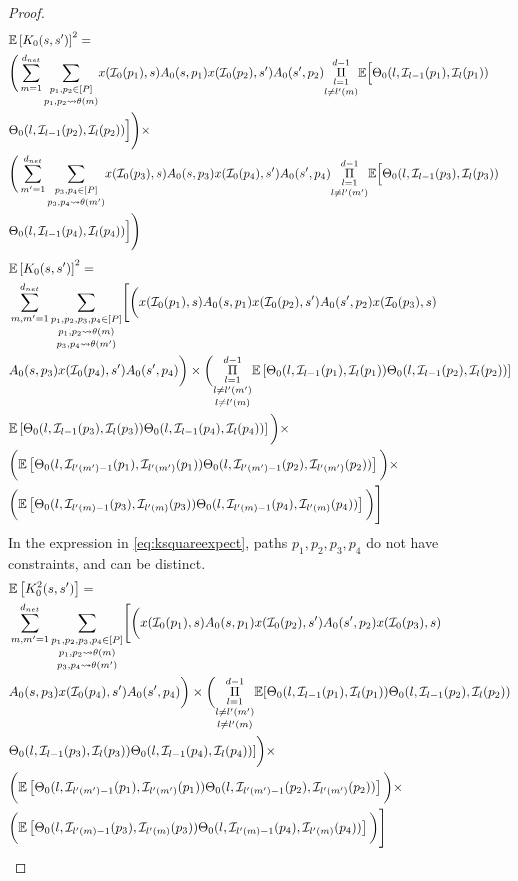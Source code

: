 \begin{appendix}
\begin{proof}
\begin{align*}
&\mathbb{E}\left[K_0(s,s')\right]^2=\\
&\Bigg(\sum_{m=1}^{d_{net}}\underset{p_1,p_2\rightsquigarrow\theta(m)}{\sum_{p_1,p_2\in[P]}}x(\mathcal{I}_0(p_1),s)A_0(s,p_1)x(\mathcal{I}_0(p_2),s')A_0(s',p_2) \underset{l\neq l'(m)}{\underset{l=1}{\overset{d-1}{\Pi}}} \mathbb{E}\Big[{\Theta}_0(l,\mathcal{I}_{l-1}(p_1),\mathcal{I}_{l}(p_1)) &\\ 
&{\Theta}_0(l,\mathcal{I}_{l-1}(p_2),\mathcal{I}_{l}(p_2))\Big]\Bigg)\times\\
&\Bigg(\sum_{m'=1}^{d_{net}}\underset{p_3,p_4\rightsquigarrow\theta(m')}{\sum_{p_3,p_4\in[P]}}x(\mathcal{I}_0(p_3),s)A_0(s,p_3)x(\mathcal{I}_0(p_4),s')A_0(s',p_4) \underset{l\neq l'(m')}{\underset{l=1}{\overset{d-1}{\Pi}}} \mathbb{E}\Big[{\Theta}_0(l,\mathcal{I}_{l-1}(p_3),\mathcal{I}_{l}(p_3)) &\\
&{\Theta}_0(l,\mathcal{I}_{l-1}(p_4),\mathcal{I}_{l}(p_4))\Big]\Bigg)\\
\end{align*}
\begin{align}\label{eq:kexpectsquare}
&\mathbb{E}\left[K_0(s,s')\right]^2=\nonumber\\
&\sum_{m,m'=1}^{d_{net}}\underset{p_3,p_4\rightsquigarrow\theta(m')}{\underset{p_1,p_2\rightsquigarrow\theta(m)}{\sum_{p_1,p_2,p_3,p_4\in[P]}}}\Bigg[\bigg(x(\mathcal{I}_0(p_1),s)A_0(s,p_1)x(\mathcal{I}_0(p_2),s')A_0(s',p_2)x(\mathcal{I}_0(p_3),s)\nonumber\\ 
&A_0(s,p_3)x(\mathcal{I}_0(p_4),s')A_0(s',p_4)\bigg)\times \bigg( \underset{l\neq l'(m)} {\underset{l\neq l'(m')}{\underset{l=1}{\overset{d-1}{\Pi}}}} \mathbb{E}\left[{\Theta}_0(l,\mathcal{I}_{l-1}(p_1),\mathcal{I}_{l}(p_1)) {\Theta}_0(l,\mathcal{I}_{l-1}(p_2),\mathcal{I}_{l}(p_2))\right]\nonumber\\
&\mathbb{E}\left[{\Theta}_0(l,\mathcal{I}_{l-1}(p_3),\mathcal{I}_{l}(p_3)) {\Theta}_0(l,\mathcal{I}_{l-1}(p_4),\mathcal{I}_{l}(p_4))\right] \bigg)\times\nonumber\\
&\bigg( \mathbb{E}\left[{\Theta}_0(l,\mathcal{I}_{l'(m')-1}(p_1),\mathcal{I}_{l'(m')}(p_1)) {\Theta}_0(l,\mathcal{I}_{l'(m')-1}(p_2),\mathcal{I}_{l'(m')}(p_2))\right]\bigg)\times\nonumber\\
&\bigg(\mathbb{E}\left[{\Theta}_0(l,\mathcal{I}_{l'(m)-1}(p_3),\mathcal{I}_{l'(m)}(p_3)) {\Theta}_0(l,\mathcal{I}_{l'(m)-1}(p_4),\mathcal{I}_{l'(m)}(p_4))\right] \bigg)\Bigg]
\end{align}
In the expression in \eqref{eq:ksquareexpect}, paths $p_1,p_2,p_3,p_4$ do not have constraints, and can be distinct.
\begin{align}\label{eq:ksquareexpect}
&\mathbb{E}\left[K^2_0(s,s')\right]=\nonumber\\
&\sum_{m,m'=1}^{d_{net}}\underset{p_3,p_4\rightsquigarrow\theta(m')}{\underset{p_1,p_2\rightsquigarrow\theta(m)}{\sum_{p_1,p_2,p_3,p_4\in[P]}}}\Bigg[\bigg(x(\mathcal{I}_0(p_1),s)A_0(s,p_1)x(\mathcal{I}_0(p_2),s')A_0(s',p_2)x(\mathcal{I}_0(p_3),s)\nonumber\\&
A_0(s,p_3)x(\mathcal{I}_0(p_4),s')A_0(s',p_4)\bigg)\times\bigg( \underset{l\neq l'(m)} {\underset{l\neq l'(m')}{\underset{l=1}{\overset{d-1}{\Pi}}}} \mathbb{E}[{\Theta}_0(l,\mathcal{I}_{l-1}(p_1),\mathcal{I}_{l}(p_1)) {\Theta}_0(l,\mathcal{I}_{l-1}(p_2),\mathcal{I}_{l}(p_2))\nonumber\\&
{\Theta}_0(l,\mathcal{I}_{l-1}(p_3),\mathcal{I}_{l}(p_3)) {\Theta}_0(l,\mathcal{I}_{l-1}(p_4),\mathcal{I}_{l}(p_4))] \bigg)\times\nonumber\\
&\bigg( \mathbb{E}\left[{\Theta}_0(l,\mathcal{I}_{l'(m')-1}(p_1),\mathcal{I}_{l'(m')}(p_1)) {\Theta}_0(l,\mathcal{I}_{l'(m')-1}(p_2),\mathcal{I}_{l'(m')}(p_2))\right]\bigg)\times\nonumber\\
&\bigg(\mathbb{E}\left[{\Theta}_0(l,\mathcal{I}_{l'(m)-1}(p_3),\mathcal{I}_{l'(m)}(p_3)) {\Theta}_0(l,\mathcal{I}_{l'(m)-1}(p_4),\mathcal{I}_{l'(m)}(p_4))\right] \bigg)\Bigg]
\end{align}


\end{proof}
\end{appendix}
